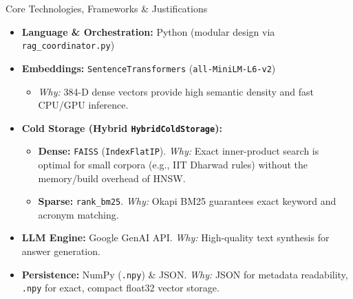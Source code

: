 \documentclass[aspectratio=169]{beamer}
\begin{document}
\begin{frame}{Core Technologies, Frameworks \& Justifications}
    \begin{itemize}
        \item \textbf{Language \& Orchestration:} Python (modular design via \texttt{rag\_coordinator.py})
        \item \textbf{Embeddings:} \texttt{SentenceTransformers} (\texttt{all-MiniLM-L6-v2})
        \begin{itemize}
            \item \textit{Why:} 384-D dense vectors provide high semantic density and fast CPU/GPU inference.
        \end{itemize}
        \item \textbf{Cold Storage (Hybrid \texttt{HybridColdStorage}):} 
        \begin{itemize}
            \item \textbf{Dense:} \texttt{FAISS} (\texttt{IndexFlatIP}). \textit{Why:} Exact inner-product search is optimal for small corpora (e.g., IIT Dharwad rules) without the memory/build overhead of HNSW.
            \item \textbf{Sparse:} \texttt{rank\_bm25}. \textit{Why:} Okapi BM25 guarantees exact keyword and acronym matching.
        \end{itemize}
        \item \textbf{LLM Engine:} Google GenAI API. \textit{Why:} High-quality text synthesis for answer generation.
        \item \textbf{Persistence:} NumPy (\texttt{.npy}) \& JSON. \textit{Why:} JSON for metadata readability, \texttt{.npy} for exact, compact float32 vector storage.
    \end{itemize}
\end{frame}
\end{document}
